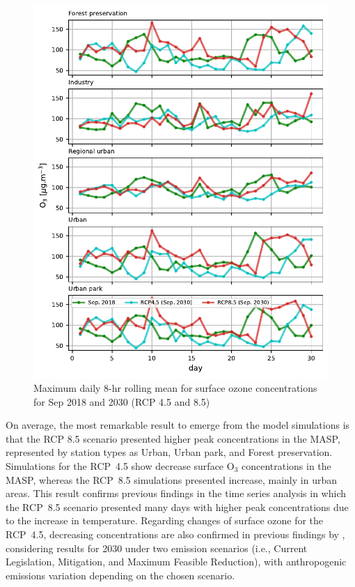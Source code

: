 \begin{figure}[!hbt]
\begin{center}
	\includegraphics{fig/MDA8_type_rcps}
\end{center}
  \caption{Maximum daily 8-hr rolling mean for surface ozone concentrations for Sep 2018 and 2030 (RCP 4.5 and 8.5)}
  \label{fig:MDA8_rcps}
\end{figure}

On average, the most remarkable result to emerge from the model simulations is that the RCP 8.5 scenario presented higher peak concentrations in the MASP, represented by station types as Urban, Urban park, and Forest preservation.
Simulations for the RCP~4.5 show decrease surface O$_3$ concentrations in the MASP, whereas the RCP~8.5 simulations presented increase, mainly in urban areas.
This result confirms previous findings in the time series analysis in which the RCP~8.5 scenario presented many days with higher peak concentrations due to the increase in temperature.
Regarding changes of surface ozone for the RCP~4.5, decreasing concentrations are also confirmed in previous findings by \citet{Schuch2020}, considering results for 2030 under two emission scenarios (i.e., Current Legislation, Mitigation, and Maximum Feasible Reduction), with anthropogenic emissions variation depending on the chosen scenario.

